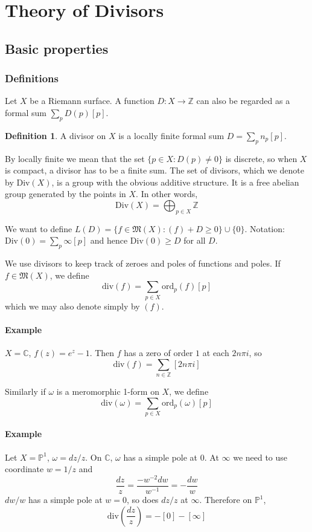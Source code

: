\documentclass[12pt]{article}
\theoremstyle{plain}
\theoremstyle{definition}
\newtheorem{definition}[equation]{Definition}
\newcommand{\fM}{\mathfrak{M}}
\newcommand{\IC}{\mathbb{C}}
\newcommand{\IP}{\mathbb{P}}
\newcommand{\IZ}{\mathbb{Z}}
\newcommand{\<}{\langle}
\renewcommand{\>}{\rangle}
\newcommand{\w}{\omega}
\newcommand{\ord}{\mathrm{ord}}
\newcommand{\Div}{\mathrm{Div}}
\renewcommand{\div}{\mathrm{div}}
\begin{document}
\section{Theory of Divisors}

\subsection{Basic properties}
\subsubsection{Definitions}
Let $X$ be a Riemann surface. A function $D : X \to \IZ$ can also be regarded as a formal sum $\sum_p D(p)[p]$. 
\begin{definition}
A divisor on $X$ is a locally finite formal sum $D = \sum_p n_p [p]$.
\end{definition}
By locally finite we mean that the set $\{ p \in X : D(p) \neq 0\}$ is discrete, so when $X$ is compact, a divisor has to be a finite sum. 
The set of divisors, which we denote by $\Div(X)$, is a group with the obvious additive structure. It is a free abelian group generated by the points in $X$. In other words, 
$$ \Div(X) = \bigoplus_{p \in X} \IZ $$


We want to define $L(D) = \{ f \in \fM(X): (f) + D \ge 0 \} \cup \{ 0 \}$. Notation: $\Div(0) = \sum_p \infty [p]$ and hence $\Div(0) \ge D$ for all $D$. 

We use divisors to keep track of zeroes and poles of functions and poles. If $f \in \fM(X)$, we define 
$$ \div(f) = \sum_{p \in X} \ord_p (f) [p] $$
which we may also denote simply by $(f)$. 

\paragraph{Example} $X = \IC$, $f(z) = e^z - 1$. Then $f$ has a zero of order $1$ at each $2n \pi i$, so 
$$ \div(f) = \sum_{n \in \IZ} [2n \pi i] $$

Similarly if $\w$ is a meromorphic 1-form on $X$, 
we define $$ \div(\w) = \sum_{p \in X} \ord_p(\w)[p]$$

\paragraph{Example} Let $X = \IP^1$, $\w = dz/z$. On $\IC$, $\w$ has a simple pole at $0$. At $\infty$ we need to use coordinate $w = 1/z$ and 
$$ \frac{dz}{z} = \frac{-w^{-2} dw}{w^{-1}} = - \frac{dw}{w} $$
$dw/w$ has a simple pole at $w = 0$, so does $dz/z$ at $\infty$. Therefore on $\IP^1$, 
$$ \div(\frac{dz}{z}) = -[0] - [\infty] $$
\end{document}
